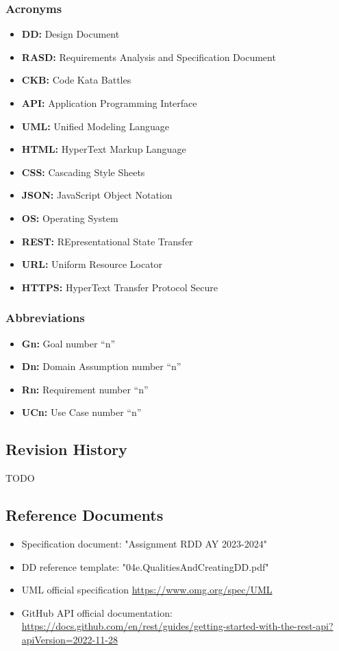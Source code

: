 \subsubsection{Acronyms}
\begin{itemize}
    \item {\textbf{DD:} Design Document}
    \item {\textbf{RASD:} Requirements Analysis and Specification Document}
    \item {\textbf{CKB:} Code Kata Battles}
    \item {\textbf{API:} Application Programming Interface}
    \item {\textbf{UML:} Unified Modeling Language}
    \item {\textbf{HTML:} HyperText Markup Language}
    \item {\textbf{CSS:} Cascading Style Sheets}
    \item {\textbf{JSON:} JavaScript Object Notation}
    \item {\textbf{OS:} Operating System}
    \item {\textbf{REST:} REpresentational State Transfer}
    \item {\textbf{URL:} Uniform Resource Locator}
    \item {\textbf{HTTPS:} HyperText Transfer Protocol Secure}
\end{itemize}
\subsubsection{Abbreviations}
\begin{itemize}
    \item {\textbf{Gn:} Goal number “n”}
    \item {\textbf{Dn:} Domain Assumption number “n”}
    \item {\textbf{Rn:} Requirement number “n”}
    \item {\textbf{UCn:} Use Case number “n”}
\end{itemize}

\subsection{Revision History}
TODO

\subsection{Reference Documents}
\begin{itemize}
    \item Specification document: "Assignment RDD AY 2023-2024"
    \item DD reference template: "04e.QualitiesAndCreatingDD.pdf"
    \item UML official specification \href{https://www.omg.org/spec/UML}{https://www.omg.org/spec/UML}
    \item GitHub API official documentation: \href{https://docs.github.com/en/rest/guides/getting-started-with-the-rest-api?apiVersion=2022-11-28}{https://docs.github.com/en/rest/guides/getting-started-with-the-rest-api?apiVersion=2022-11-28}
\end{itemize}

